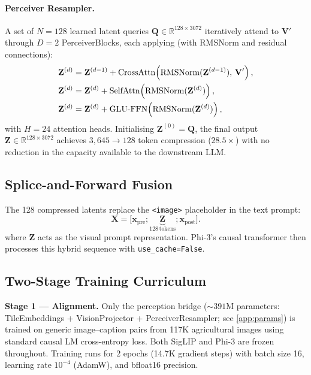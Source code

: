 \documentclass{article}
\begin{document}
\paragraph{Perceiver Resampler.}
A set of $N = 128$ learned latent queries
$\mathbf{Q} \in \mathbb{R}^{128 \times 3072}$
iteratively attend to $\mathbf{V}'$ through $D = 2$ PerceiverBlocks,
each applying (with RMSNorm and residual connections):
\begin{align}
  \mathbf{Z}^{(d)} &= \mathbf{Z}^{(d-1)}
    + \mathrm{CrossAttn}\!\left(\mathrm{RMSNorm}(\mathbf{Z}^{(d-1)}),\,
    \mathbf{V}'\right), \notag\\
  \mathbf{Z}^{(d)} &= \mathbf{Z}^{(d)}
    + \mathrm{SelfAttn}\!\left(\mathrm{RMSNorm}(\mathbf{Z}^{(d)})\right),
    \notag\\
  \mathbf{Z}^{(d)} &= \mathbf{Z}^{(d)}
    + \mathrm{GLU\text{-}FFN}\!\left(\mathrm{RMSNorm}(\mathbf{Z}^{(d)})\right),
  \label{eq:perceiver}
\end{align}
with $H = 24$ attention heads.
Initialising $\mathbf{Z}^{(0)} = \mathbf{Q}$, the final output
$\mathbf{Z} \in \mathbb{R}^{128 \times 3072}$ achieves $3{,}645 \to 128$
token compression ($28.5\times$) with no reduction in the capacity
available to the downstream LLM.

\subsection{Splice-and-Forward Fusion}

The 128 compressed latents replace the \texttt{<image>} placeholder
in the text prompt:
\begin{equation}
  \mathbf{X} = \bigl[\mathbf{x}_{\text{pre}};
  \underbrace{\mathbf{Z}}_{128\,\text{tokens}};
  \mathbf{x}_{\text{post}}\bigr].
  \label{eq:splice}
\end{equation}
where $\mathbf{Z}$ acts as the visual prompt representation. Phi-3's causal transformer then processes this hybrid sequence with \texttt{use\_cache=False}.

\subsection{Two-Stage Training Curriculum}

\smallskip\noindent\textbf{Stage 1 --- Alignment.}
Only the perception bridge (${{\sim}}391$M parameters:
TileEmbeddings + VisionProjector + PerceiverResampler; see \cref{app:params}) is trained
on generic image--caption pairs from 117K agricultural images using
standard causal LM cross-entropy loss.
Both SigLIP and Phi-3 are frozen throughout.
Training runs for 2 epochs (14.7K gradient steps) with batch size 16,
learning rate $10^{-4}$ (AdamW), and bfloat16 precision.
\end{document}
